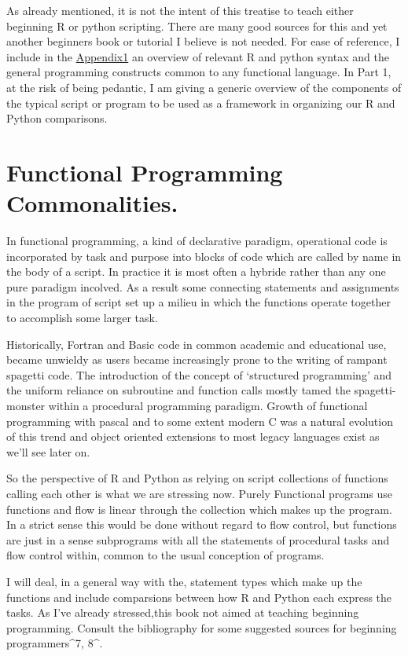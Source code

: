 \documentclass[]{book}
\theoremstyle{definition}
\theoremstyle{definition}
\theoremstyle{definition}
\theoremstyle{remark}
\begin{document}
As already mentioned, it is not the intent of this treatise to teach
either beginning R or python scripting. There are many good sources for
this and yet another beginners book or tutorial I believe is not needed.
For ease of reference, I include in the \href{Appendix_1.md}{Appendix1}
an overview of relevant R and python syntax and the general programming
constructs common to any functional language. In Part 1, at the risk of
being pedantic, I am giving a generic overview of the components of the
typical script or program to be used as a framework in organizing our R
and Python comparisons.

\section{Functional Programming
Commonalities.}\label{functional-programming-commonalities.}

In functional programming, a kind of declarative paradigm, operational
code is incorporated by task and purpose into blocks of code which are
called by name in the body of a script. In practice it is most often a
hybride rather than any one pure paradigm incolved. As a result some
connecting statements and assignments in the program of script set up a
milieu in which the functions operate together to accomplish some larger
task.

Historically, Fortran and Basic code in common academic and educational
use, became unwieldy as users became increasingly prone to the writing
of rampant spagetti code. The introduction of the concept of `structured
programming' and the uniform reliance on subroutine and function calls
mostly tamed the spagetti-monster within a procedural programming
paradigm. Growth of functional programming with pascal and to some
extent modern C was a natural evolution of this trend and object
oriented extensions to most legacy languages exist as we'll see later
on.

So the perspective of R and Python as relying on script collections of
functions calling each other is what we are stressing now. Purely
Functional programs use functions and flow is linear through the
collection which makes up the program. In a strict sense this would be
done without regard to flow control, but functions are just in a sense
subprograms with all the statements of procedural tasks and flow control
within, common to the usual conception of programs.

I will deal, in a general way with the, statement types which make up
the functions and include comparsions between how R and Python each
express the tasks. As I've already stressed,this book not aimed at
teaching beginning programming. Consult the bibliography for some
suggested sources for beginning programmers\^{}7, 8\^{}.
\end{document}
